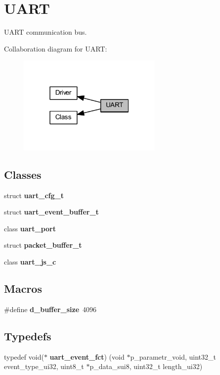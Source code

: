 \section{U\+A\+RT}
\label{group___u_a_r_t}


U\+A\+RT communication bus.  


Collaboration diagram for U\+A\+RT\+:
\nopagebreak
\begin{figure}[H]
\begin{center}
\leavevmode
\includegraphics[width=199pt]{group___u_a_r_t}
\end{center}
\end{figure}
\subsection*{Classes}
\begin{DoxyCompactItemize}
\item 
struct \textbf{ uart\+\_\+cfg\+\_\+t}
\item 
struct \textbf{ uart\+\_\+event\+\_\+buffer\+\_\+t}
\item 
class \textbf{ uart\+\_\+port}
\item 
struct \textbf{ packet\+\_\+buffer\+\_\+t}
\item 
class \textbf{ uart\+\_\+js\+\_\+c}
\end{DoxyCompactItemize}
\subsection*{Macros}
\begin{DoxyCompactItemize}
\item 
\#define \textbf{ d\+\_\+buffer\+\_\+size}~4096
\end{DoxyCompactItemize}
\subsection*{Typedefs}
\begin{DoxyCompactItemize}
\item 
typedef void($\ast$ \textbf{ uart\+\_\+event\+\_\+fct}) (void $\ast$p\+\_\+parametr\+\_\+void, uint32\+\_\+t event\+\_\+type\+\_\+ui32, uint8\+\_\+t $\ast$p\+\_\+data\+\_\+sui8, uint32\+\_\+t length\+\_\+ui32)
\end{DoxyCompactItemize}
